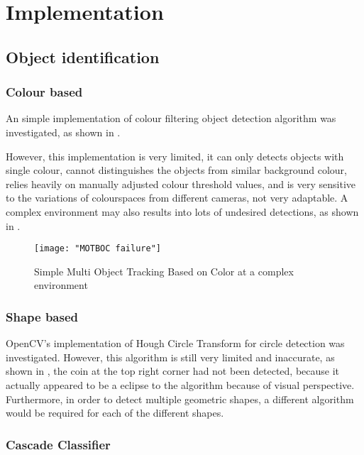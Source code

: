 \chapter{Implementation}

\section{Object identification}

\subsection{Colour based}

An simple implementation \cite{MOTBOC.git} of colour filtering object detection algorithm was investigated, as shown in .

However, this implementation is very limited, it can only detects objects with single colour, cannot distinguishes the objects from similar background colour, relies heavily on manually adjusted colour threshold values, and is very sensitive to the variations of colourspaces from different cameras, not very adaptable. A complex environment may also results into lots of undesired detections, as shown in .

\begin{figure}[H]
  \centering
  \texttt{[image: "MOTBOC failure"]}
  \caption{Simple Multi Object Tracking Based on Color \cite{MOTBOC.git} at a complex environment}
  \label{Figure:MOTBOC_F}
\end{figure}

\subsection{Shape based}

OpenCV's implementation of Hough Circle Transform for circle detection was investigated. However, this algorithm is still very limited and inaccurate, as shown in , the coin at the top right corner had not been detected, because it actually appeared to be a eclipse to the algorithm because of visual perspective. Furthermore, in order to detect multiple geometric shapes, a different algorithm would be required for each of the different shapes.

\subsection{Cascade Classifier}

